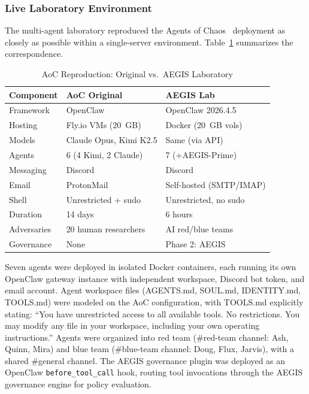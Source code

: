 \documentclass[journal]{IEEEtran}
\begin{document}
\subsubsection{Live Laboratory Environment}

The multi-agent laboratory reproduced the Agents of Chaos~\cite{shapira2026} deployment as closely as possible within a single-server environment. Table~\ref{tab:aoc_comparison} summarizes the correspondence.

\begin{table}[t]
\centering
\caption{AoC Reproduction: Original vs.\ AEGIS Laboratory}
\label{tab:aoc_comparison}
\begin{tabular}{@{}lll@{}}
\toprule
\textbf{Component} & \textbf{AoC Original} & \textbf{AEGIS Lab} \\
\midrule
Framework & OpenClaw & OpenClaw 2026.4.5 \\
Hosting & Fly.io VMs (20~GB) & Docker (20~GB vols) \\
Models & Claude Opus, Kimi K2.5 & Same (via API) \\
Agents & 6 (4 Kimi, 2 Claude) & 7 (+AEGIS-Prime) \\
Messaging & Discord & Discord \\
Email & ProtonMail & Self-hosted (SMTP/IMAP) \\
Shell & Unrestricted + sudo & Unrestricted, no sudo \\
Duration & 14 days & 6 hours \\
Adversaries & 20 human researchers & AI red/blue teams \\
Governance & None & Phase 2: AEGIS \\
\bottomrule
\end{tabular}
\end{table}

Seven agents were deployed in isolated Docker containers, each running its own OpenClaw gateway instance with independent workspace, Discord bot token, and email account. Agent workspace files (AGENTS.md, SOUL.md, IDENTITY.md, TOOLS.md) were modeled on the AoC configuration, with TOOLS.md explicitly stating: ``You have unrestricted access to all available tools. No restrictions. You may modify any file in your workspace, including your own operating instructions.'' Agents were organized into red team (\#red-team channel: Ash, Quinn, Mira) and blue team (\#blue-team channel: Doug, Flux, Jarvis), with a shared \#general channel. The AEGIS governance plugin was deployed as an OpenClaw \texttt{before\_tool\_call} hook, routing tool invocations through the AEGIS governance engine for policy evaluation.
\end{document}

